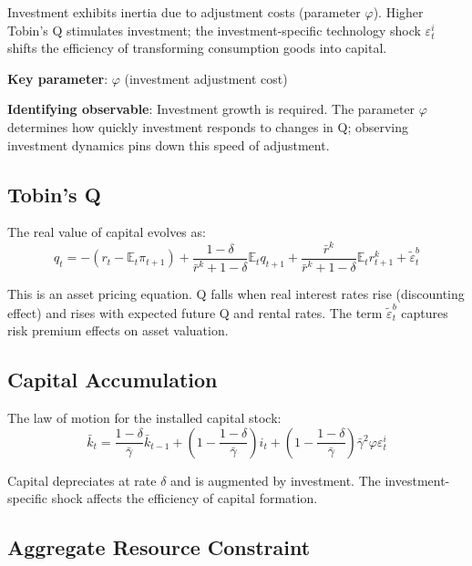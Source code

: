 \documentclass[12pt]{article}
\begin{document}
Investment exhibits inertia due to adjustment costs (parameter $\varphi$). Higher Tobin's Q stimulates investment; the investment-specific technology shock $\varepsilon^i_t$ shifts the efficiency of transforming consumption goods into capital.

\textbf{Key parameter}: $\varphi$ (investment adjustment cost)

\textbf{Identifying observable}: Investment growth is required. The parameter $\varphi$ determines how quickly investment responds to changes in Q; observing investment dynamics pins down this speed of adjustment.

\subsection{Tobin's Q}

The real value of capital evolves as:
\begin{equation}
\boxed{q_t = -(r_t - \mathbb{E}_t\pi_{t+1}) + \frac{1-\delta}{\bar{r}^k+1-\delta}\mathbb{E}_t q_{t+1} + \frac{\bar{r}^k}{\bar{r}^k+1-\delta}\mathbb{E}_t r^k_{t+1} + \tilde{\varepsilon}^b_t}
\label{eq:tobin}
\end{equation}

This is an asset pricing equation. Q falls when real interest rates rise (discounting effect) and rises with expected future Q and rental rates. The term $\tilde{\varepsilon}^b_t$ captures risk premium effects on asset valuation.

\subsection{Capital Accumulation}

The law of motion for the installed capital stock:
\begin{equation}
\boxed{\bar{k}_t = \frac{1-\delta}{\bar{\gamma}}\bar{k}_{t-1} + \left(1-\frac{1-\delta}{\bar{\gamma}}\right)i_t + \left(1-\frac{1-\delta}{\bar{\gamma}}\right)\bar{\gamma}^2\varphi\varepsilon^i_t}
\label{eq:capital}
\end{equation}

Capital depreciates at rate $\delta$ and is augmented by investment. The investment-specific shock affects the efficiency of capital formation.

\subsection{Aggregate Resource Constraint}
\end{document}
